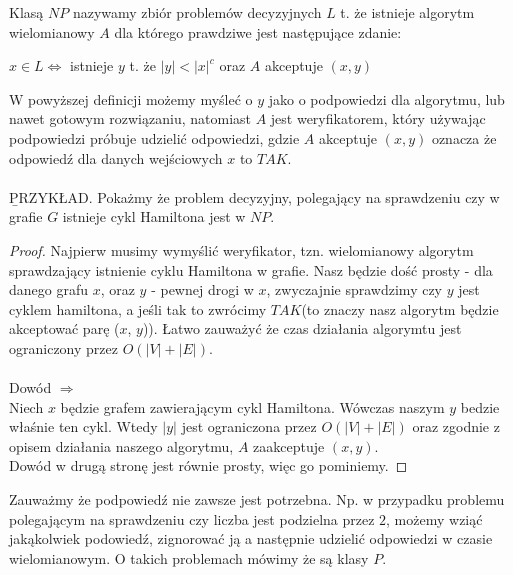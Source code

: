 \begin{definition}[Klasa $NP$]
Klasą $NP$ nazywamy zbiór problemów decyzyjnych $L$ t. że istnieje algorytm wielomianowy $A$ dla którego prawdziwe jest następujące zdanie:
\begin{center}
$x \in L \iff $ istnieje $y$ t. że $|y| < |x|^c$ oraz $A$ akceptuje $(x,y)$
\end{center}
\end{definition}
\noindent
W powyższej definicji możemy myśleć o $y$ jako o podpowiedzi dla algorytmu, lub nawet gotowym rozwiązaniu, natomiast $A$ jest weryfikatorem, który używając podpowiedzi próbuje udzielić odpowiedzi, gdzie $A$ akceptuje $(x,y)$ oznacza że odpowiedź dla danych wejściowych $x$ to $TAK$.
\\
\\ \noindent
\b{PRZYKŁAD}. Pokażmy że problem decyzyjny, polegający na sprawdzeniu czy w grafie $G$ istnieje cykl Hamiltona jest w $NP$.
\begin{proof}
Najpierw musimy wymyślić weryfikator, tzn. wielomianowy algorytm sprawdzający istnienie cyklu Hamiltona w grafie. 
Nasz będzie dość prosty - dla danego grafu $x$, oraz $y$ - pewnej drogi w $x$, zwyczajnie sprawdzimy czy $y$ jest cyklem hamiltona, a jeśli tak to zwrócimy $TAK$(to znaczy nasz algorytm będzie akceptować parę ($x$, $y$)). 
Łatwo zauważyć że czas działania algorymtu jest ograniczony przez $O(|V| + |E|)$.
\\
\\ \noindent
Dowód $\Rightarrow$ \\ \noindent
Niech $x$ będzie grafem zawierającym cykl Hamiltona. 
Wówczas naszym $y$ bedzie właśnie ten cykl. 
Wtedy $|y|$ jest ograniczona przez $O(|V| + |E|)$ oraz zgodnie z opisem działania naszego algorytmu, $A$ zaakceptuje $(x, y)$. 
\\ \noindent
Dowód w drugą stronę jest równie prosty, więc go pominiemy.
\end{proof}

\noindent
Zauważmy że podpowiedź nie zawsze jest potrzebna. 
Np. w przypadku problemu polegającym na sprawdzeniu czy liczba jest podzielna przez $2$, możemy wziąć jakąkolwiek podowiedź, zignorować ją a następnie udzielić odpowiedzi w czasie wielomianowym. O takich problemach mówimy że są klasy $P$. 
\\
\\ \noindent

